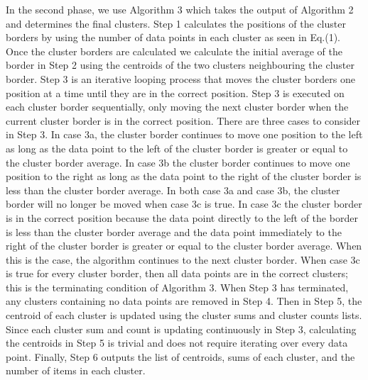 \documentclass[conference,compsoc]{IEEEtran}
\begin{document}
In the second phase, we use Algorithm 3 which takes the output of Algorithm 2 and determines the final clusters. Step 1 calculates the positions of the cluster borders by using the number of data points in each cluster as seen in Eq.(1). Once the cluster borders are calculated we calculate the initial average of the border in Step 2 using the centroids of the two clusters neighbouring the cluster border. Step 3 is an iterative looping process that moves the cluster borders one position at a time until they are in the correct position. Step 3 is executed on each cluster border sequentially, only moving the next cluster border when the current cluster border is in the correct position. There are three cases to consider in Step 3. In case 3a, the cluster border continues to move one position to the left as long as the data point to the left of the cluster border is greater or equal to the cluster border average. In case 3b the cluster border continues to move one position to the right as long as the data point to the right of the cluster border is less than the cluster border average. In both case 3a and case 3b, the cluster border will no longer be moved when case 3c is true. In case 3c the cluster border is in the correct position because the data point directly to the left of the border is less than the cluster border average and the data point immediately to the right of the cluster border is greater or equal to the cluster border average. When this is the case, the algorithm continues to the next cluster border. When case 3c is true for every cluster border, then all data points are in the correct clusters; this is the terminating condition of Algorithm 3. When Step 3 has terminated, any clusters containing no data points are removed in Step 4. Then in Step 5, the centroid of each cluster is updated using the cluster sums and cluster counts lists. Since each cluster sum and count is updating continuously in Step 3, calculating the centroids in Step 5 is trivial and does not require iterating over every data point. Finally, Step 6 outputs the list of centroids, sums of each cluster, and the number of items in each cluster.
\end{document}
